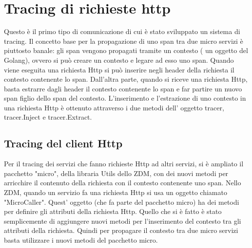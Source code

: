 \documentclass[a4paper,12pt,titlepage,italian,openany]{report}
\begin{document}
\section{Tracing di richieste http}
Questo è il primo tipo di comunicazione di cui è stato sviluppato un sistema di tracing. Il concetto base per la propagazione di uno span tra due micro servizi è piuttosto banale: gli span vengono propagati tramite un contesto ( un oggetto del Golang), ovvero si può  creare un contesto e legare ad esso uno span. Quando viene eseguita una richiesta Http si può inserire negli header della richiesta il contesto contenente lo span. 
Dall'altra parte, quando si riceve una richiesta Http, basta estrarre dagli header il contesto contenente lo span e far partire un nuovo span figlio dello span del contesto. 
L'inserimento e l'estrazione di uno contesto in una richiesta Http è ottenuto attraverso i due metodi dell' oggetto tracer, tracer.Inject e tracer.Extract.
\subsection{Tracing del client Http}
Per il tracing dei servizi che fanno richieste Http ad altri servizi, si è ampliato il pacchetto "micro", della libraria Utils dello ZDM\cite{zdm:1}, 
con dei nuovi metodi per arricchire il contenuto della richiesta con il contesto contenente uno span.
Nello ZDM\cite{zdm:1}, quando un servizio fa una richiesta Http si usa un oggetto chiamato "MicroCaller".
 Quest' oggetto (che fa parte del pacchetto micro) ha dei metodi per definire gli attributi della richiesta Http. Quello che si è fatto è stato semplicemente di aggiungere nuovi metodi per l'inserimento 
del contesto tra gli attributi della richiesta. Quindi per propagare il contesto tra due micro servizi basta utilizzare i nuovi metodi del pacchetto micro.
\end{document}
